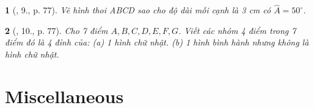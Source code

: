 \documentclass{article}
\newtheorem{baitoan}{}
\begin{document}
\begin{baitoan}[\cite{Tuyen_Toan_6}, 9., p. 77]
	Vẽ hình thoi ABCD sao cho độ dài mỗi cạnh là {\rm3 cm} có $\widehat{A} = 50^\circ$.
\end{baitoan}

\begin{baitoan}[\cite{Tuyen_Toan_6}, 10., p. 77]
	Cho 7 điểm $A,B,C,D,E,F,G$. Viết các nhóm 4 điểm trong 7 điểm đó là 4 đỉnh của: (a) 1 hình chữ nhật. (b) 1 hình bình hành nhưng không là hình chữ nhật.
	\begin{center}
	\end{center}
\end{baitoan}



\section{Miscellaneous}


\printbibliography[heading=bibintoc]
\end{document}
